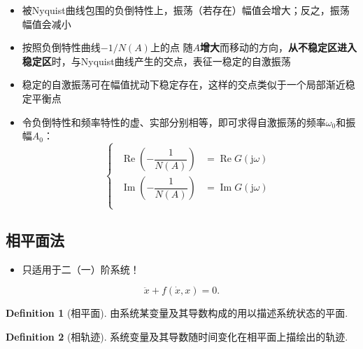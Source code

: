 \documentclass[14pt,a4paper]{article}
\theoremstyle{plain}
\theoremstyle{definition}
\newtheorem*{dfn}{Definition}
\theoremstyle{remark}
\theoremstyle{plain}
\theoremstyle{plain}
\theoremstyle{plain}
\theoremstyle{definition}
\theoremstyle{remark}
\numberwithin{equation}{section}
\begin{document}
                    \begin{itemize}
                        \item 被Nyquist曲线包围的负倒特性上，振荡（若存在）幅值会增大；反之，振荡幅值会减小 
                        \item 按照负倒特性曲线$-1 / N(A)$上的点 随$A$\textbf{增大}而移动的方向，\textbf{从不稳定区进入稳定区}时，与Nyquist曲线产生的交点，表征一稳定的自激振荡 
                        \item 稳定的自激振荡可在幅值扰动下稳定存在，这样的交点类似于一个局部渐近稳定平衡点 
                        \item 令负倒特性和频率特性的虚、实部分别相等，即可求得自激振荡的频率$\omega_0$和振幅$A_0$：
                            \[
                            \begin{cases}
                                \begin{aligned}
                                    \mathop{\text{Re}} \left( -\dfrac{1}{N(A)} \right) &= \mathop{\text{Re}}  G(\mathrm{j} \omega ) \\
                                    \mathop{\text{Im}} \left( -\dfrac{1}{N(A)} \right) &= \mathop{\text{Im}}  G(\mathrm{j} \omega ) \\
                                \end{aligned}
                            \end{cases} 
                            \]  
                    \end{itemize}   
                    
		\subsection{相平面法}%
		\label{sub:相平面法}
		
			\begin{itemize}
				\item 只适用于二（一）阶系统！
			\end{itemize} 

			\begin{equation}
			\label{eq:phaseplanediffeq}
			\ddot{x} + f\left( \dot x, x \right) = 0
			.\end{equation} 

			\begin{dfn}[相平面]  
			\label{dfn:相平面}
				由系统某变量及其导数构成的用以描述系统状态的平面.
			\end{dfn} 

			\begin{dfn}[相轨迹]  
			\label{dfn:相轨迹}
				系统变量及其导数随时间变化在相平面上描绘出的轨迹.
			\end{dfn} 
\end{document}
